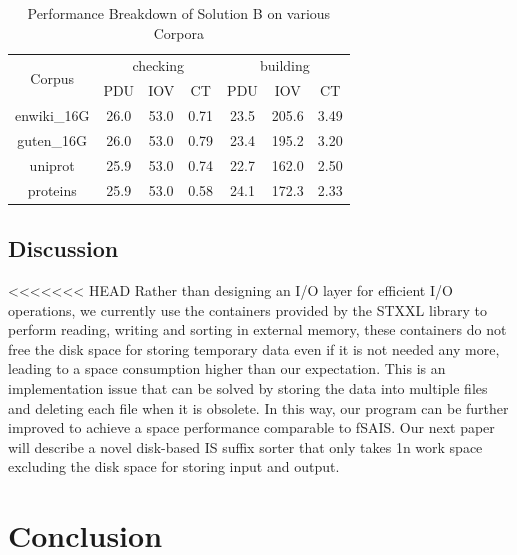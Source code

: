 \documentclass[10pt,journal,compsoc]{IEEEtran}
\begin{document}
\begin{table}%
	\caption{Performance Breakdown of Solution B on various Corpora}
	\label{tbl:breakdown_solutionb}
	\centering
	\begin{tabular}{|c|c|c|c|c|c|c|}
		\hline
		\multirow{2}{*}{Corpus} & \multicolumn{3}{|c}{checking} & \multicolumn{3}{|c|}{building} \\\cline{2-7}
		& PDU & IOV & CT & PDU & IOV & CT \\\hline
		enwiki\_16G & 26.0 & 53.0 & 0.71 & 23.5 & 205.6 & 3.49 \\\hline
		guten\_16G & 26.0 & 53.0 & 0.79 & 23.4 & 195.2 & 3.20 \\\hline
		uniprot & 25.9 & 53.0 & 0.74 & 22.7 & 162.0 & 2.50 \\\hline
		proteins & 25.9 & 53.0 & 0.58 & 24.1 & 172.3 & 2.33 \\\hline
	\end{tabular}
\end{table}%

\subsection{Discussion}

<<<<<<< HEAD
Rather than designing an I/O layer for efficient I/O operations, we currently use the containers provided by the STXXL library to perform reading, writing and sorting in external memory, these containers do not free the disk space for storing temporary data even if it is not needed any more, leading to a space consumption higher than our expectation. This is an implementation issue that can be solved by storing the data into multiple files and deleting each file when it is obsolete. In this way, our program can be further improved to achieve a space performance comparable to fSAIS. Our next paper will describe a novel disk-based IS suffix sorter that only takes 1n work space excluding the disk space for storing input and output. 

\section{Conclusion} \label{sec:conclusion}
\end{document}
